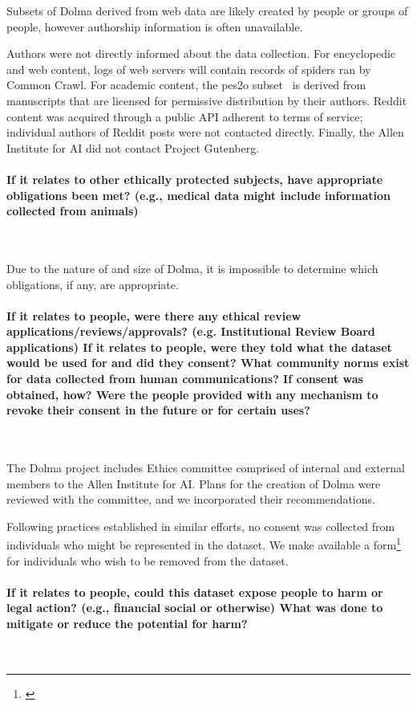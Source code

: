 \documentclass{article}
\newcommand{\dolma}{Dolma\xspace}
\begin{document}
Subsets of \dolma derived from web data are likely created by people or groups of people, however authorship information is often unavailable. 

Authors were not directly informed about the data collection. 
For encyclopedic and web content, logs of web servers will contain records of spiders ran by Common Crawl.
For academic content, the pes2o subset~\citep{peS2o} is derived from manuscripts that are licensed for permissive distribution by their authors.
Reddit content was acquired through a public API adherent to terms of service; individual authors of Reddit posts were not contacted directly.
Finally, the Allen Institute for AI did not contact Project Gutenberg.
 
\paragraph{If it relates to other ethically protected subjects, have appropriate obligations been met? (e.g., medical data might include information collected from animals)}~

Due to the nature of and size of \dolma, it is impossible to determine which obligations, if any, are appropriate. 

\paragraph{If it relates to people, were there any ethical review applications/reviews/approvals? (e.g. Institutional Review Board applications) If it relates to people, were they told what the dataset would be used for and did they consent? What community norms exist for data collected from human communications? If consent was obtained, how? Were the people provided with any mechanism to revoke their consent in the future or for certain uses?}~

The \dolma project includes Ethics committee comprised of 
internal and external members to the Allen Institute for AI.
Plans for the creation of \dolma were reviewed with the committee, and we incorporated their recommendations. 

Following practices established in similar efforts, no consent was collected from individuals who might be represented in the dataset.
We make available a form\footnote{\label{foot:data-removal}\href{https://forms.gle/q4BNUUxUxKwKkfdT6}{}} for individuals who wish to be removed from the dataset. 

\paragraph{If it relates to people, could this dataset expose people to harm or legal action? (e.g., financial social or otherwise) What was done to mitigate or reduce the potential for harm?}~
\end{document}
